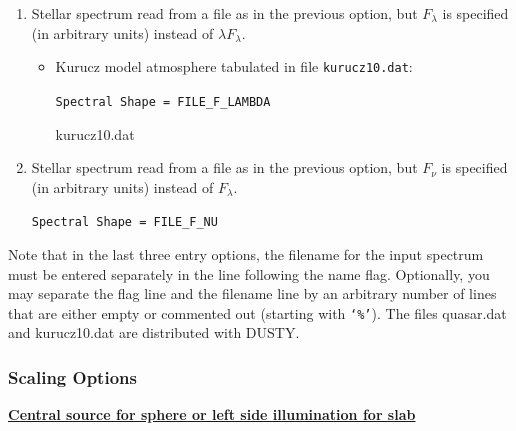 \documentclass[11pt]{article}
\begin{document}
\begin{enumerate}
\begin{itemize}
{\tt Spectral Shape = FILE\_LAMBDA\_F\_LAMBDA

quasar.dat}
\end{itemize}

\item  Stellar spectrum read from a file as in the previous option, but
    $F_\lambda$ is specified (in arbitrary units) instead of $\lambda
    F_\lambda$.

\begin{itemize}
\item Kurucz model atmosphere tabulated in file {\tt kurucz10.dat}:

{\tt Spectral Shape = FILE\_F\_LAMBDA

kurucz10.dat}
\end{itemize}

\item  Stellar spectrum read from a file as in the previous option, but
    $F_\nu$ is specified (in arbitrary units) instead of $F_\lambda$.

{\tt Spectral Shape = FILE\_F\_NU}
\end{enumerate}

Note that in the last three entry options, the filename for the input spectrum
must be entered separately in the line following the name flag. Optionally, you
may separate the flag line and the filename line by an arbitrary number of
lines that are either empty or commented out (starting with {\tt `\%'}). The
files quasar.dat and kurucz10.dat are distributed with DUSTY.


\subsubsection{Scaling Options}
\label{scaling_radiation}

{\bf\underline{Central source for sphere or left side illumination for slab}}\\
\end{document}
